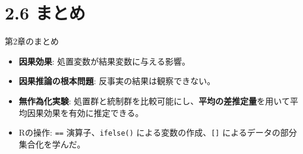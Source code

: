 \documentclass[
  ignorenonframetext,
]{beamer}
\providecommand{\tightlist}{%
  \setlength{\itemsep}{0pt}\setlength{\parskip}{0pt}}
\begin{document}
\hypertarget{ux307eux3068ux3081}{%
\section{2.6 まとめ}\label{ux307eux3068ux3081}}

\begin{frame}[fragile]{第2章のまとめ}
\protect\hypertarget{ux7b2c2ux7ae0ux306eux307eux3068ux3081}{}
\begin{itemize}
\tightlist
\item
  \textbf{因果効果}: 処置変数が結果変数に与える影響。
\item
  \textbf{因果推論の根本問題}: 反事実の結果は観察できない。
\item
  \textbf{無作為化実験}:
  処置群と統制群を比較可能にし、\textbf{平均の差推定量}を用いて平均因果効果を有効に推定できる。
\item
  Rの操作: \texttt{==} 演算子、\texttt{ifelse()}
  による変数の作成、\texttt{{[}{]}} によるデータの部分集合化を学んだ。
\end{itemize}
\end{frame}
\end{document}
